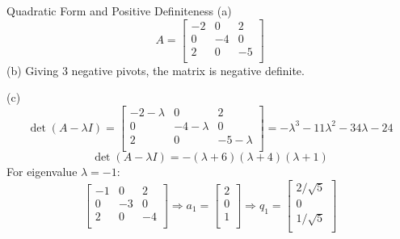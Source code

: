 \documentclass{beamer}
\begin{document}
\begin{frame}{Quadratic Form and Positive Definiteness}
    (a) \begin{equation*}
        A=\left[ \begin{matrix}
        -2&		0&		2\\
        0&		-4&		0\\
        2&		0&		-5\\
    \end{matrix} \right]
    \end{equation*}
    (b) Giving 3 negative pivots, the matrix is negative definite.

    (c)
\begin{equation*}
    \det \left( A-\lambda I \right) =\left[ \begin{matrix}
	-2-\lambda&		0&		2\\
	0&		-4-\lambda&		0\\
	2&		0&		-5-\lambda\\
\end{matrix} \right] =-\lambda ^3-11\lambda ^2-34\lambda -24
\end{equation*}
\begin{equation*}
    \det \left( A-\lambda I \right)=-\left( \lambda +6 \right) \left( \lambda +4 \right) \left( \lambda +1 \right)
\end{equation*}
For eigenvalue $\lambda = -1$:
\begin{equation*}
    \left[ \begin{matrix}
	-1&		0&		2\\
	0&		-3&		0\\
	2&		0&		-4\\
\end{matrix} \right] \Rightarrow a_1=\left[ \begin{array}{c}
	2\\
	0\\
	1\\
\end{array} \right] \Rightarrow q_1=\left[ \begin{array}{c}
	2/\sqrt{5}\\
	0\\
	1/\sqrt{5}\\
\end{array} \right]
\end{equation*}

\end{frame}
\end{document}

